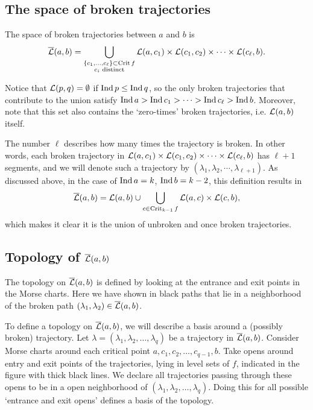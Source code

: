 \subsection{The space of broken trajectories}
\begin{definition}
    The space of broken trajectories between $a$ and  $b$ is
     \[
         \overline{\mathcal L}(a, b) = \bigcup_{\substack{\{c_1, \ldots, c_\ell\} \subset \operatorname{Crit} f\\ c_i \text{ distinct}}} \mathcal L(a, c_1) \times \mathcal L(c_1, c_2) \times  \cdots \times \mathcal L(c_\ell, b)
    .\] 
\end{definition}
\begin{remark}
    Notice that $\mathcal L(p, q) = \emptyset$ if $\operatorname{Ind} p \le \operatorname{Ind} q$, so the only broken trajectories that contribute to the union satisfy $\operatorname{Ind} a > \operatorname{Ind} c_1 > \cdots >\operatorname{Ind} c_\ell > \operatorname{Ind} b$.
    Moreover, note that this set also contains the `zero-times' broken trajectories,  i.e. $\mathcal L(a, b)$ itself.
\end{remark}
    The number $\ell$ describes how many times the trajectory is broken.
    In other words, each broken trajectory in $\mathcal L(a, c_1) \times \mathcal L(c_1, c_2) \times  \cdots \times \mathcal L(c_\ell, b)$ has $ \ell+1$ segments,  and we will denote such a trajectory by $(\lambda_1, \lambda_2, \cdots, \lambda_{\ell+1})$.
    As discussed above, in the case of $\operatorname{Ind} a = k$, $\operatorname{Ind} b = k -2$, this definition results in 
    \[
        \overline{\mathcal L}(a, b) = \mathcal L(a, b) \cup  \bigcup_{c \in \operatorname{Crit}_{k-1} f}  \mathcal L(a, c) \times \mathcal L(c, b)
    ,\] 
    which makes it clear it is the union of unbroken and once broken trajectories.

\subsection{Topology of $\overline{\mathcal L}(a, b)$}


\begin{marginfigure}
    \centering
    \caption{The topology on $\overline{\mathcal L}(a, b) $ is defined by looking at the entrance and exit points in the Morse charts.
        Here we have shown in black paths that lie in a neighborhood of the broken path $(\lambda_1, \lambda_2) \in \overline{\mathcal L}(a, b)$.
    }
    \label{fig:morse-homology-definition-of-topology}
\end{marginfigure}
To define a topology on $\overline{\mathcal L}(a, b)$,
we will describe a basis around a (possibly broken) trajectory.
Let $\lambda = (\lambda_1, \lambda_2, \ldots, \lambda_q)$ be a trajectory in $\overline{\mathcal L}(a, b)$.
Consider Morse charts around each critical point  $a, c_1, c_2, \ldots, c_{q-1}, b$.
Take opens around entry and exit points of the trajectories, lying in level sets of $f$, indicated in the figure with thick black lines.
We declare all trajectories passing through these opens to be in a open neighborhood of $(\lambda_1, \lambda_2, \ldots, \lambda_q)$.
Doing this for all possible `entrance and exit opens' defines a basis of the topology.

